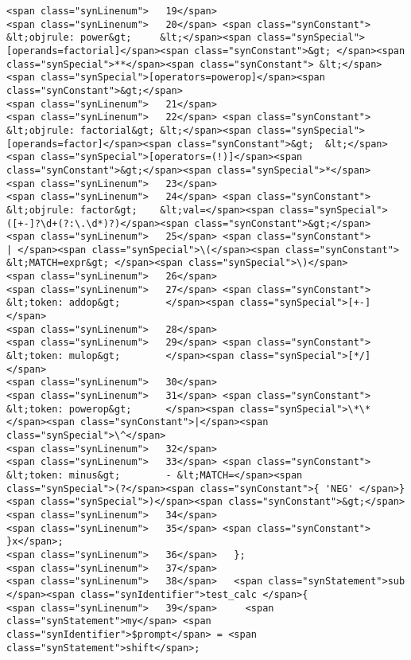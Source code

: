 \begin{verbatim}
<span class="synLinenum">   19</span> 
<span class="synLinenum">   20</span> <span class="synConstant">        &lt;objrule: power&gt;     &lt;</span><span class="synSpecial">[operands=factorial]</span><span class="synConstant">&gt; </span><span class="synSpecial">**</span><span class="synConstant"> &lt;</span><span class="synSpecial">[operators=powerop]</span><span class="synConstant">&gt;</span>
<span class="synLinenum">   21</span> 
<span class="synLinenum">   22</span> <span class="synConstant">        &lt;objrule: factorial&gt; &lt;</span><span class="synSpecial">[operands=factor]</span><span class="synConstant">&gt;  &lt;</span><span class="synSpecial">[operators=(!)]</span><span class="synConstant">&gt;</span><span class="synSpecial">*</span>
<span class="synLinenum">   23</span> 
<span class="synLinenum">   24</span> <span class="synConstant">        &lt;objrule: factor&gt;    &lt;val=</span><span class="synSpecial">([+-]?\d+(?:\.\d*)?)</span><span class="synConstant">&gt;</span>
<span class="synLinenum">   25</span> <span class="synConstant">                           | </span><span class="synSpecial">\(</span><span class="synConstant"> &lt;MATCH=expr&gt; </span><span class="synSpecial">\)</span>
<span class="synLinenum">   26</span> 
<span class="synLinenum">   27</span> <span class="synConstant">        &lt;token: addop&gt;        </span><span class="synSpecial">[+-]</span>
<span class="synLinenum">   28</span> 
<span class="synLinenum">   29</span> <span class="synConstant">        &lt;token: mulop&gt;        </span><span class="synSpecial">[*/]</span>
<span class="synLinenum">   30</span> 
<span class="synLinenum">   31</span> <span class="synConstant">        &lt;token: powerop&gt;      </span><span class="synSpecial">\*\*</span><span class="synConstant">|</span><span class="synSpecial">\^</span>
<span class="synLinenum">   32</span> 
<span class="synLinenum">   33</span> <span class="synConstant">        &lt;token: minus&gt;        - &lt;MATCH=</span><span class="synSpecial">(?</span><span class="synConstant">{ 'NEG' </span>}<span class="synSpecial">)</span><span class="synConstant">&gt;</span>
<span class="synLinenum">   34</span> 
<span class="synLinenum">   35</span> <span class="synConstant">      }x</span>;
<span class="synLinenum">   36</span>   };
<span class="synLinenum">   37</span> 
<span class="synLinenum">   38</span>   <span class="synStatement">sub </span><span class="synIdentifier">test_calc </span>{
<span class="synLinenum">   39</span>     <span class="synStatement">my</span> <span class="synIdentifier">$prompt</span> = <span class="synStatement">shift</span>;

\end{verbatim}
